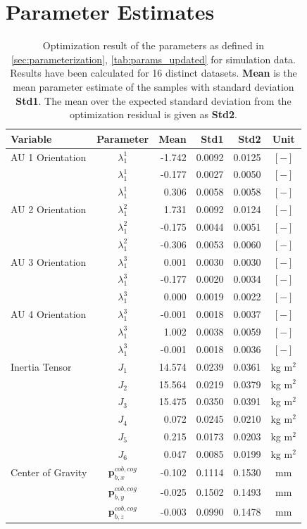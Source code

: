 \section{Parameter Estimates}
\label{sec:app_parameter_est}
\begin{table}[H]
\captionsetup{width=0.9\textwidth}
\centering
\begin{tabular}{lcrrrc}
Variable & Parameter & Mean & Std1 & Std2 & Unit \\
\hline \hline
AU 1 Orientation & $\lambda_1^1$ & -1.742 & 0.0092 & 0.0125 & $[-]$ \\
                 & $\lambda_1^1$ & -0.177 & 0.0027 & 0.0050 & $[-]$ \\
                 & $\lambda_1^1$ &  0.306 & 0.0058 & 0.0058 & $[-]$ \\
AU 2 Orientation & $\lambda_1^2$ &  1.731 & 0.0092 & 0.0124 & $[-]$ \\
                 & $\lambda_1^2$ & -0.175 & 0.0044 & 0.0051 & $[-]$ \\
                 & $\lambda_1^2$ & -0.306 & 0.0053 & 0.0060 & $[-]$ \\
AU 3 Orientation & $\lambda_1^3$ &  0.001 & 0.0030 & 0.0030 & $[-]$ \\
                 & $\lambda_1^3$ & -0.177 & 0.0020 & 0.0034 & $[-]$ \\
                 & $\lambda_1^3$ &  0.000 & 0.0019 & 0.0022 & $[-]$ \\
AU 4 Orientation & $\lambda_1^3$ & -0.001 & 0.0018 & 0.0037 & $[-]$ \\
                 & $\lambda_1^3$ &  1.002 & 0.0038 & 0.0059 & $[-]$ \\
                 & $\lambda_1^3$ & -0.001 & 0.0018 & 0.0036 & $[-]$ \\
\hline
Inertia Tensor & $J_1$ & 14.574 & 0.0239 & 0.0361 & kg m$^2$ \\
               & $J_2$ & 15.564 & 0.0219 & 0.0379 & kg m$^2$ \\
               & $J_3$ & 15.475 & 0.0350 & 0.0391 & kg m$^2$ \\
               & $J_4$ &  0.072 & 0.0245 & 0.0210 & kg m$^2$ \\
               & $J_5$ &  0.215 & 0.0173 & 0.0203 & kg m$^2$ \\
               & $J_6$ &  0.047 & 0.0085 & 0.0199 & kg m$^2$ \\
\hline
Center of Gravity & $\mathbf{p}_{b,x}^{cob,cog}$ & -0.102 & 0.1114 & 0.1530 & mm \\
                  & $\mathbf{p}_{b,y}^{cob,cog}$ & -0.025 & 0.1502 & 0.1493 & mm \\
                  & $\mathbf{p}_{b,z}^{cob,cog}$ & -0.003 & 0.0990 & 0.1478 & mm \\
\hline
\end{tabular}
\caption{Optimization result of the parameters as defined in \cref{sec:parameterization}, \cref{tab:params_updated} for simulation data. Results have been calculated for 16 distinct datasets. \textbf{Mean} is the mean parameter estimate of the samples with standard deviation \textbf{Std1}. The mean over the expected standard deviation from the optimization residual is given as \textbf{Std2}.}
\end{table}
